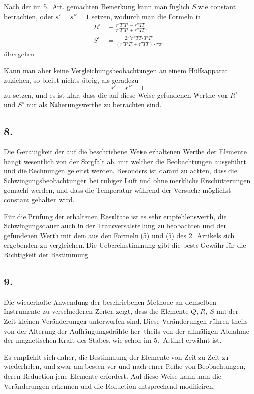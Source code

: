 \documentclass[12pt,a4paper]{article}
\begin{document}
Nach der im 5.~Art. gemachten Bemerkung kann man füglich $S$ wie constant betrachten, oder $s' = s'' = 1$ setzen, wodurch man die Formeln in
\begin{align}
R^{\circ} &= \frac{r'T'T' - r''TT}{r'T'T' + r''TT},\\
S^{\circ} &= \frac{2r'r''TT \cdot T'T'}{(r'T'T' + r''TT) \cdot \pi\pi}
\end{align}
übergehen.

Kann man aber keine Vergleichungsbeobachtungen an einem Hülfsapparat zuziehen, so bleibt nichts übrig, als geradezu
\begin{equation}
r' = r'' = 1
\end{equation}
zu setzen, und es ist klar, dass die auf diese Weise gefundenen Werthe von $R^{\circ}$ und $S^{\circ}$ nur als Näherungswerthe zu betrachten sind.

\subsection*{8.}

Die Genauigkeit der auf die beschriebene Weise erhaltenen Werthe der Elemente hängt wesentlich von der Sorgfalt ab, mit welcher die Beobachtungen ausgeführt und die Rechnungen geleitet werden. Besonders ist darauf zu achten, dass die Schwingungsbeobachtungen bei ruhiger Luft und ohne merkliche Erschütterungen gemacht werden, und dass die Temperatur während der Versuche möglichst constant gehalten wird.

Für die Prüfung der erhaltenen Resultate ist es sehr empfehlenswerth, die Schwingungsdauer auch in der Transversalstellung zu beobachten und den gefundenen Werth mit dem aus den Formeln (5) und (6) des 2.~Artikels sich ergebenden zu vergleichen. Die Uebereinstimmung gibt die beste Gewähr für die Richtigkeit der Bestimmung.

\subsection*{9.}

Die wiederholte Anwendung der beschriebenen Methode an demselben Instrumente zu verschiedenen Zeiten zeigt, dass die Elemente $Q$, $R$, $S$ mit der Zeit kleinen Veränderungen unterworfen sind. Diese Veränderungen rühren theils von der Alterung der Aufhängungsdrähte her, theils von der allmäligen Abnahme der magnetischen Kraft des Stabes, wie schon im 5.~Artikel erwähnt ist.

Es empfiehlt sich daher, die Bestimmung der Elemente von Zeit zu Zeit zu wiederholen, und zwar am besten vor und nach einer Reihe von Beobachtungen, deren Reduction jene Elemente erfordert. Auf diese Weise kann man die Veränderungen erkennen und die Reduction entsprechend modificiren.
\end{document}
